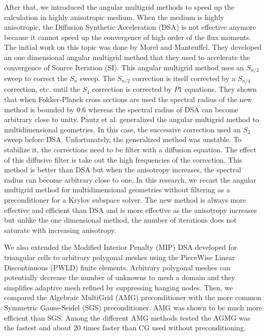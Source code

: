 After that, we introduced the angular multigrid methods to speed up
the calculation in highly anisotropic medium. When the medium is highly
anisotropic, the Diffusion Synthetic Acceleration (DSA) is not effective
anymore because it cannot speed up the convergence of high order of the 
flux moments. The initial work on this topic was done by Morel and Manteuffel. 
They developed an one dimensional angular multigrid method that they used to
accelerate the convergence of Source Iteration (SI). This angular multigrid 
method uses an $S_{n/2}$ sweep to correct the $S_n$ sweep. The $S_{n/2}$ 
correction is itself corrected by a $S_{n/4}$ correction, etc. until the 
$S_4$ correction is corrected by $P1$ equations. They shown that when 
Fokker-Planck cross sections are used the spectral radius of the new 
method is bounded by 0.6 whereas the spectral radius of DSA can become 
arbitrary close to unity. Pautz et al. generalized the angular multigrid 
method to multidimensional geometries. In this case, the successive correction
used an $S_2$ sweep before DSA. Unfortunately, the generalized method was 
unstable. To stabilize it, the corrections need to be filter with a 
diffusion equation. The effect of this diffusive filter is take out the high 
frequencies of the correction. This method is better than DSA but when the
anisotropy increases, the spectral radius can become arbitrary close to one.
In this research, we recast the angular multigrid method for
multidimensional geometries without filtering as a preconditioner for a Krylov
subspace solver. The new method is always more effective and efficient than 
DSA and is more effective as the anisotropy increases but unlike the one 
dimensional method, the number of iterations does not saturate with 
increasing anisotropy.

We also extended the Modified Interior Penalty (MIP) DSA
developed for triangular cells to arbitrary polygonal meshes using the
PieceWise Linear Discontinuous (PWLD) finite elements. Arbitrary polygonal
meshes can potentially decrease the number of unknowns to mesh a domain and
they simplifies adaptive mesh refined by suppressing hanging nodes. Then, 
we compared the Algebraic MultiGrid (AMG) preconditioner with the more 
common Symmetric Gauss-Seidel (SGS) preconditioner. AMG was shown to be much 
more efficient than SGS. Among the different AMG methods tested the AGMG 
was the fastest and about 20 times faster than CG used without preconditioning.
